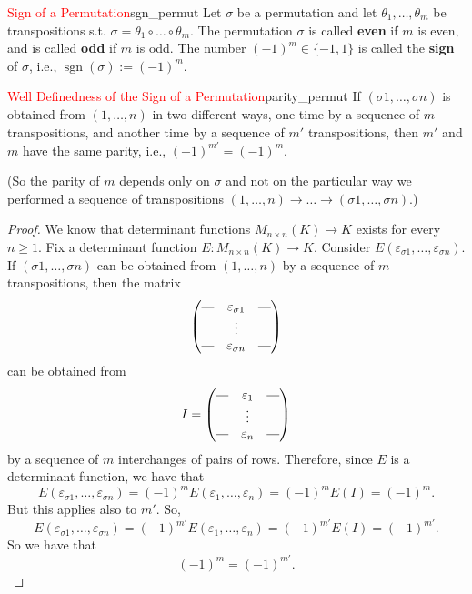 \begin{definition}{\textcolor{red}{Sign of a Permutation}}{sgn_permut}
	Let $\sigma$ be a permutation and let $\theta_1, \hdots, \theta_m$ be transpositions s.t. $\sigma = \theta_1 \circ \hdots \circ \theta_m$. The permutation $\sigma$ is called \textbf{even} if $m$ is even, and is called \textbf{odd} if $m$ is odd. The number $(-1)^m \in \{-1, 1\}$ is called the \textbf{sign} of $\sigma$, i.e., $\operatorname{sgn}(\sigma) := (-1)^m$.
\end{definition}

\begin{lemma}{\textcolor{red}{Well Definedness of the Sign of a Permutation}}{parity_permut}
	If $(\sigma 1, \hdots , \sigma n)$ is obtained from $(1, \hdots , n)$ in two different ways, one time by a sequence of $m$ transpositions, and another time by a sequence of $m'$ transpositions, then $m'$ and $m$ have the same parity, i.e., $(-1)^{m'} = (-1)^m$.
	
	(So the parity of $m$ depends only on $\sigma$ and not on the particular way we performed a sequence of transpositions $(1, \hdots , n) \to \hdots \to (\sigma 1, \hdots, \sigma n)$.)
\end{lemma}

\begin{proof}
	We know that determinant functions $M_{n\times n}(K) \to K$ exists for every $n \geq 1$. Fix a determinant function $E:M_{n\times n}(K) \to K$. Consider $E(\varepsilon_{\sigma 1}, \hdots , \varepsilon_{\sigma n})$. If $(\sigma 1, \hdots, \sigma n)$ can be obtained from $(1, \hdots, n)$ by a sequence of $m$ transpositions, then the matrix
	\[
		\begin{pmatrix}
			\rule[0.5ex]{1em}{0.4pt} & \varepsilon_{\sigma 1} & \rule[0.5ex]{1em}{0.4pt}\\
			& \vdots & \\
			\rule[0.5ex]{1em}{0.4pt} & \varepsilon_{\sigma n} & \rule[0.5ex]{1em}{0.4pt}
		\end{pmatrix}
	\]
	can be obtained from
	\[
		I = \begin{pmatrix}
			\rule[0.5ex]{1em}{0.4pt} & \varepsilon_1 & \rule[0.5ex]{1em}{0.4pt}\\
			& \vdots & \\
			\rule[0.5ex]{1em}{0.4pt} & \varepsilon_n & \rule[0.5ex]{1em}{0.4pt}
		\end{pmatrix}
	\]
	by a sequence of $m$ interchanges of pairs of rows. Therefore, since $E$ is a determinant function, we have that
	\[
		E(\varepsilon_{\sigma 1}, \hdots, \varepsilon_{\sigma n}) = (-1)^m E(\varepsilon_1, \hdots, \varepsilon_n) = (-1)^m E(I) = (-1)^m.
	\]
	But this applies also to $m'$. So, 
	\[
		E(\varepsilon_{\sigma 1}, \hdots, \varepsilon_{\sigma n}) = (-1)^{m'}E(\varepsilon_1, \hdots, \varepsilon_n) = (-1)^{m'} E(I) = (-1)^{m'}.
	\]
	So we have that
	\[
		(-1)^m = (-1)^{m'}.
	\]
	\qedhere
\end{proof}

